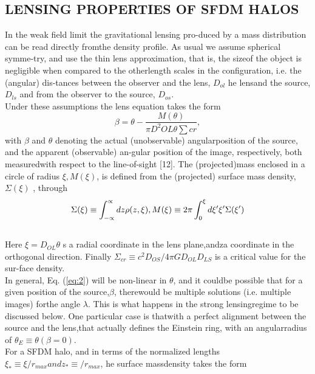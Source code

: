 \documentclass[10pt,a4paper]{article}
\begin{document}
\begin{multicols}{2}
\section{\large LENSING PROPERTIES OF SFDM HALOS}
In  the  weak  field  limit  the  gravitational  lensing  pro-duced by a mass distribution can be read directly fromthe density profile.  As usual we assume spherical symme-try, and use the thin lens approximation, that is, the sizeof  the  object  is  negligible  when  compared  to  the  otherlength scales in the configuration, i.e.  the (angular) dis-tances between the observer and the lens, $D_{ol}$ he lensand the source, $D_{ls}$ and from the observer to the source, $D_{os}$.\\
Under these assumptions the lens equation takes the form
\begin{equation}\label{eq:2}
		\beta=\theta-\frac{M(\theta)}{\pi D^{2}{OL}\theta\sum{cr}},
	\end{equation}
with $\beta$ and $\theta$ denoting the actual (unobservable) angularposition of the source, and the apparent (observable) an-gular position of the image, respectively, both measuredwith  respect  to  the  line-of-sight  [12].   The  (projected)mass  enclosed  in  a  circle  of  radius $\xi, M(\xi)$, is defined from the (projected) surface mass density,$\Sigma(\xi)$ , through\\
\begin{equation}\label{eq:3}
   	\Sigma(\xi)\equiv\int_{-\propto}^{\propto}dz \rho(z,\xi), \\ M(\xi)\equiv2\pi\int_{0}^{\xi}d\xi^{\prime}\xi^{\prime}\Sigma(\xi^{\prime})
   \end{equation}\\
Here $\xi = D_{OL}\theta$ s a radial coordinate in the lens plane,andza coordinate in the orthogonal direction.  Finally $\Sigma_{cr} \equiv c^{2} D_{OS}/4 \pi G D_{OL} D_{LS}$ is a critical value for the sur-face density.\\
In general, Eq. (\ref{eq:2}) will be non-linear in $\theta$,  and it couldbe possible that for a given position of the source,$\beta$, therewould  be  multiple  solutions  (i.e.   multiple  images)  forthe angle $\lambda$. This is what happens in the strong lensingregime to be discussed below.  One particular case is thatwith a perfect alignment between the source and the lens,that actually defines the Einstein ring, with an angularradius of $\theta_{E} \equiv \theta (\beta = 0) $.\\
For  a  SFDM  halo,  and  in  terms  of  the  normalized lengths $\xi_{*} \equiv \xi / r_{max} and z_{*} \equiv / r_{max}$, he surface massdensity takes the form\\

\end{multicols}
\end{document}
